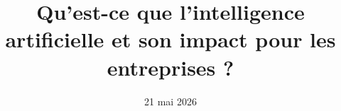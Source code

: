 

\title{Qu'est-ce que l'intelligence artificielle et son impact pour les entreprises ?}

\date{21 mai 2026}

\usefootlinewithsections




\endinput
